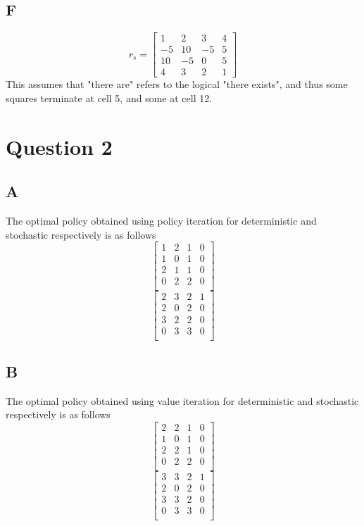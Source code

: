 \documentclass{article}
\begin{document}
\subsection{F}
\[ r_s = 
	\begin{bmatrix}
		1 & 2 & 3 & 4 \\
		-5 & 10 & -5 & 5 \\
		10 & -5 & 0 & 5\\
		4 & 3 & 2 & 1
	\end{bmatrix}
\]
This assumes that "there are" refers to the logical "there exists", and thus some
squares terminate at cell 5, and some at cell 12.


\section{Question 2}

\subsection{A}
The optimal policy obtained using policy iteration for deterministic and stochastic respectively is as 
follows
\[
	\begin{bmatrix}
		1 & 2 & 1 & 0 \\
		1 & 0 & 1 & 0 \\
		2 & 1 & 1 & 0 \\
		0 & 2 & 2 & 0\\
	\end{bmatrix}
\]\[
	\begin{bmatrix}
		2 & 3 & 2 & 1 \\
		2 & 0 & 2 & 0 \\
		3 & 2 & 2 & 0 \\
		0 & 3 & 3 & 0\\
	\end{bmatrix}
\]

\subsection{B}
The optimal policy obtained using value iteration for deterministic and stochastic respectively is as 
follows
\[
	\begin{bmatrix}
		2 & 2 & 1 & 0 \\
		1 & 0 & 1 & 0 \\
		2 & 2 & 1 & 0 \\
		0 & 2 & 2 & 0\\
	\end{bmatrix}
\]\[
	\begin{bmatrix}
		3 & 3 & 2 & 1 \\
		2 & 0 & 2 & 0 \\
		3 & 3 & 2 & 0 \\
		0 & 3 & 3 & 0\\
	\end{bmatrix}
\]
\end{document}
